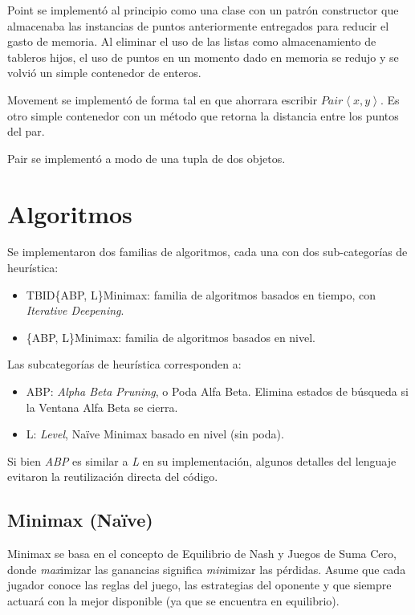 \documentclass[10pt,a4paper,notitlepage]{article}
\begin{document}
Point se implementó al principio como una clase con un patrón constructor que almacenaba las instancias de puntos anteriormente entregados para reducir el gasto de memoria. Al eliminar el uso de las listas como almacenamiento de tableros hijos, el uso de puntos en un momento dado en memoria se redujo y se volvió un simple contenedor de enteros.

Movement se implementó de forma tal en que ahorrara escribir $Pair\left<x, y\right>$. Es otro simple contenedor con un método que retorna la distancia entre los puntos del par.

Pair se implementó a modo de una tupla de dos objetos.



\section{Algoritmos}

Se implementaron dos familias de algoritmos, cada una con dos sub-categorías de heurística:
\begin{itemize}
\item TBID\{ABP, L\}Minimax: familia de algoritmos basados en tiempo, con \textit{Iterative Deepening}.
\item \{ABP, L\}Minimax: familia de algoritmos basados en nivel.
\end{itemize}

Las subcategorías de heurística corresponden a:
\begin{itemize}
\item ABP: \textit{Alpha Beta Pruning}, o Poda Alfa Beta. Elimina estados de búsqueda si la Ventana Alfa Beta se cierra.
\item L: \textit{Level}, Na\"ive Minimax basado en nivel (sin poda).
\end{itemize}

Si bien \textit{ABP} es similar a \textit{L} en su implementación, algunos detalles del lenguaje evitaron la reutilización directa del código. 

\subsection{Minimax (Na\"ive)}

Minimax se basa en el concepto de Equilibrio de Nash y Juegos de Suma Cero, donde \textit{max}imizar las ganancias significa \textit{min}imizar las pérdidas. Asume que cada jugador conoce las reglas del juego, las estrategias del oponente y que siempre actuará con la mejor disponible (ya que se encuentra en equilibrio).
\end{document}
